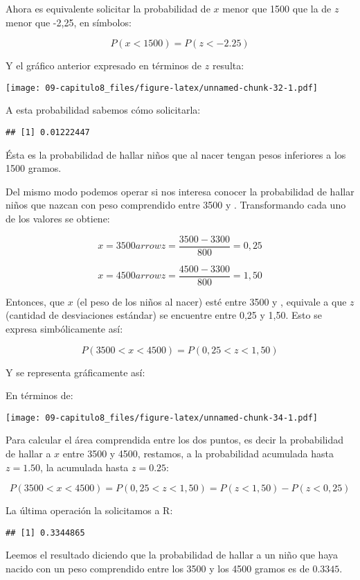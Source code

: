 \documentclass[]{article}
\begin{document}
Ahora es equivalente solicitar la probabilidad de \(x\) menor que 1500
que la de \(z\) menor que -2,25, en símbolos:

\[P(x < 1500) = P(z < - 2.25)\]

Y el gráfico anterior expresado en términos de \(z\) resulta:

\texttt{[image: 09-capitulo8\_files/figure-latex/unnamed-chunk-32-1.pdf]}

A esta probabilidad sabemos cómo solicitarla:

\begin{verbatim}
## [1] 0.01222447
\end{verbatim}

Ésta es la probabilidad de hallar niños que al nacer tengan pesos
inferiores a los 1500 gramos.

Del mismo modo podemos operar si nos interesa conocer la probabilidad de
hallar niños que nazcan con peso comprendido entre 3500 y .
Transformando cada uno de los valores se obtiene:

\[x = 3500arrow z = \frac{3500 - 3300}{800} = 0,25\]

\[x = 4500arrow z = \frac{4500 - 3300}{800} = 1,50\]

Entonces, que \(x\) (el peso de los niños al nacer) esté entre 3500 y ,
equivale a que \(z\) (cantidad de desviaciones estándar) se encuentre
entre 0,25 y 1,50. Esto se expresa simbólicamente así:

\[P(3500 < x < 4500) = P(0,25 < z < 1,50)\]

Y se representa gráficamente así:

En términos de:

\texttt{[image: 09-capitulo8\_files/figure-latex/unnamed-chunk-34-1.pdf]}

Para calcular el área comprendida entre los dos puntos, es decir la
probabilidad de hallar a \(x\) entre 3500 y 4500, restamos, a la
probabilidad acumulada hasta \(z=1.50\), la acumulada hasta \(z=0.25\):

\[P(3500 < x < 4500) = P(0,25 < z < 1,50) = P(z < 1,50) - P(z < 0,25)\]

La última operación la solicitamos a R:

\begin{verbatim}
## [1] 0.3344865
\end{verbatim}

Leemos el resultado diciendo que la probabilidad de hallar a un niño que
haya nacido con un peso comprendido entre los 3500 y los 4500 gramos es
de \(0.3345\).
\end{document}

